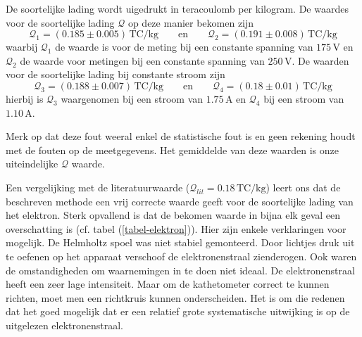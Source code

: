 
De soortelijke lading wordt uigedrukt in teracoulomb per kilogram. De waardes 
voor de soortelijke lading $\mathcal{Q}$ op deze manier bekomen zijn
$$
\mathcal{Q}_1 = (0.185 \pm 0.005)\,\textrm{TC/kg}
\qquad \textrm{en} \qquad
\mathcal{Q}_2 = (0.191 \pm 0.008)\,\textrm{TC/kg}
$$
waarbij $\mathcal{Q}_1$ de waarde is voor de meting bij een constante spanning 
van $175$\,V en $\mathcal{Q}_2$ de waarde voor metingen bij een constante 
spanning van $250$\,V. De waarden voor de soortelijke lading bij constante 
stroom zijn
$$
\mathcal{Q}_3 = (0.188 \pm 0.007)\,\textrm{TC/kg}
\qquad \textrm{en} \qquad
\mathcal{Q}_4 = (0.18 \pm 0.01)\,\textrm{TC/kg}
$$
hierbij is $\mathcal{Q}_3$ waargenomen bij een stroom van $1.75$\,A en 
$\mathcal{Q}_4$ bij een stroom van $1.10$\,A.

Merk op dat deze fout weeral enkel de statistische fout is en geen rekening 
houdt met de fouten op de meetgegevens. Het gemiddelde van deze waarden is onze 
uiteindelijke $\mathcal{Q}$ waarde.
\begin{center}
{\large
{}
}
\end{center}

Een vergelijking met de literatuurwaarde ($\mathcal{Q}_{lit} = 
0.18\,\textrm{TC/kg}$) leert ons dat de beschreven methode een vrij correcte 
waarde geeft voor de soortelijke lading van het elektron. Sterk opvallend is 
dat de bekomen waarde in bijna elk geval een overschatting is (cf. tabel 
(\ref{tabel-elektron})).
Hier zijn enkele verklaringen voor mogelijk. De Helmholtz spoel was niet 
stabiel gemonteerd. Door lichtjes druk uit te oefenen op het apparaat verschoof 
de elektronenstraal zienderogen. Ook waren de omstandigheden om waarnemingen in 
te doen niet ideaal. De elektronenstraal heeft een zeer lage intensiteit. Maar 
om de kathetometer correct te kunnen richten, moet men een richtkruis kunnen 
onderscheiden. Het is om die redenen dat het goed mogelijk dat er een relatief 
grote systematische uitwijking is op de uitgelezen elektronenstraal.

